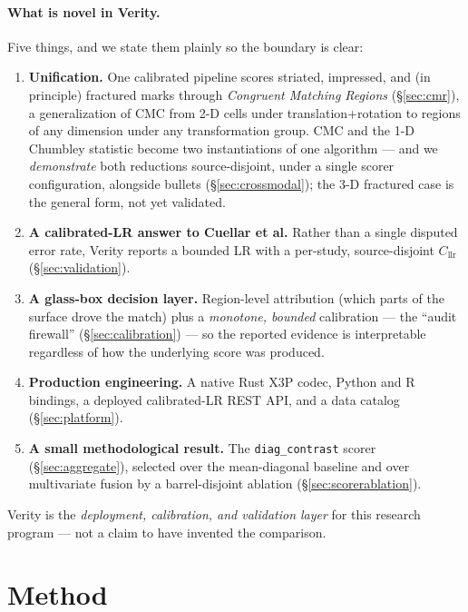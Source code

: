 \documentclass[11pt]{article}
\newcommand{\Cllr}{C_{\mathrm{llr}}}
\newcommand{\diagcontrast}{\texttt{diag\_contrast}}
\begin{document}
\paragraph{What is novel in Verity.} Five things, and we state them plainly so the
boundary is clear:
\begin{enumerate}
  \item \textbf{Unification.} One calibrated pipeline scores striated, impressed,
        and (in principle) fractured marks through \emph{Congruent Matching Regions}
        (\S\ref{sec:cmr}), a generalization of CMC from 2-D cells under
        translation+rotation to regions of any dimension under any transformation
        group. CMC and the 1-D Chumbley statistic become two instantiations of one
        algorithm --- and we \emph{demonstrate} both reductions source-disjoint, under
        a single scorer configuration, alongside bullets (\S\ref{sec:crossmodal}); the
        3-D fractured case is the general form, not yet validated.
  \item \textbf{A calibrated-LR answer to Cuellar et al.} Rather than a single
        disputed error rate, Verity reports a bounded LR with a per-study,
        source-disjoint $\Cllr$ (\S\ref{sec:validation}).
  \item \textbf{A glass-box decision layer.} Region-level attribution (which parts
        of the surface drove the match) plus a \emph{monotone, bounded} calibration
        --- the ``audit firewall'' (\S\ref{sec:calibration}) --- so the reported
        evidence is interpretable regardless of how the underlying score was
        produced.
  \item \textbf{Production engineering.} A native Rust X3P codec, Python and R
        bindings, a deployed calibrated-LR REST API, and a data catalog
        (\S\ref{sec:platform}).
  \item \textbf{A small methodological result.} The \diagcontrast{} scorer
        (\S\ref{sec:aggregate}), selected over the mean-diagonal baseline and over
        multivariate fusion by a barrel-disjoint ablation (\S\ref{sec:scorerablation}).
\end{enumerate}

\noindent
Verity is the \emph{deployment, calibration, and validation layer} for this research
program --- not a claim to have invented the comparison.

\section{Method}
\label{sec:method}
\end{document}
